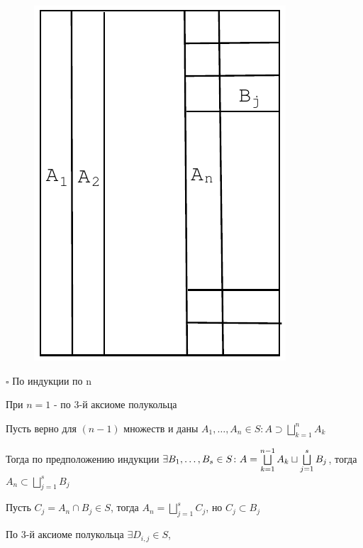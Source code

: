 \documentclass[a4paper]{report}
\newcommand*{\hm}[1]{#1\nobreak\discretionary{}%
            {\hbox{$\mathsurround=0pt #1$}}{}}
\begin{document}
\begin{figure}
\includegraphics[width=\linewidth]{3}
\end{figure}

\noindent $\square$ По индукции по n

При $n=1$ - по 3-й аксиоме полукольца

Пусть верно для $(n-1)$ множеств и даны $A_1,\ldots,A_n\in S\colon A\supset\bigsqcup\limits_{k=1}^n A_k$

\noindent Тогда по предположению индукции $\exists B_1,\ldots,B_s\hm\in S\colon A=\bigsqcup\limits_{k=1}^{n-1}A_k\sqcup\bigsqcup\limits
_{j=1}^s B_j$, тогда $A_n\subset\bigsqcup\limits_{j=1}^s B_j$

Пусть $C_j=A_n\cap B_j\in S$, тогда $A_n=\bigsqcup\limits_{j=1}^s C_j$, но $C_j\subset B_j$

По 3-й аксиоме полукольца $\exists D_{i,j}\in S$,
\end{document}
